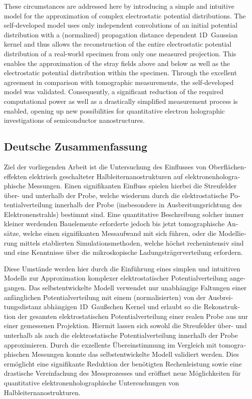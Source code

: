 These circumstances are addressed here by introducing a simple and intuitive model for the approximation of complex electrostatic potential distributions. The self-developed model uses only independent convolutions of an initial potential distribution with a (normalized) propagation distance dependent 1D~Gaussian kernel and thus allows the reconstruction of the entire electrostatic potential distribution of a real-world specimen from only one measured projection. This enables the approximation of the stray fields above and below as well as the electrostatic potential distribution within the specimen. Through the excellent agreement in comparison with tomographic measurements, the self-developed model was validated. Consequently, a significant reduction of the required computational power as well as a drastically simplified measurement process is enabled, opening up new possibilities for quantitative electron holographic investigations of semiconductor nanostructures.
\begin{otherlanguage}{ngerman}
\chapter*{Deutsche Zusammenfassung}
Ziel der vorliegenden Arbeit ist die Untersuchung des Einflusses von Oberflächeneffekten elektrisch geschalteter Halbleiternanostrukturen auf elektronenholographische Messungen. Einen signifikanten Einfluss spielen hierbei die Streufelder über- und unterhalb der Probe, welche wiederum durch die elektrostatische Potentialverteilung innerhalb der Probe (insbesondere in Ausbreitungsrichtung des Elektronenstrahls) bestimmt sind. Eine quantitative Beschreibung solcher immer kleiner werdenden Bauelemente erforderte jedoch bis jetzt tomographische Ansätze, welche einen signifikanten Messaufwand mit sich führen, oder die Modellierung mittels etablierten Simulationsmethoden, welche höchst rechenintensiv sind und eine Kenntnisse über die mikroskopische Ladungsträgerverteilung erfordern.

Diese Umstände werden hier durch die Einführung eines simplen und intuitiven Modells zur Approximation komplexer elektrostatischer Potentialverteilung angegangen. Das selbstentwickelte Modell verwendet nur unabhängige Faltungen einer anfänglichen Potentialverteilung mit einem (normalisierten) von der Ausbreitungsdistanz abhängigen 1D~Gaußschen Kernel und erlaubt so die Rekonstruktion der gesamten elektrostatischen Potentialverteilung einer realen Probe aus nur einer gemessenen Projektion. Hiermit lassen sich sowohl die Streufelder über- und unterhalb als auch die elektrostatische Potentialverteilung innerhalb der Probe approximieren. Durch die exzellente Übereinstimmung im Vergleich mit tomographischen Messungen konnte das selbstentwickelte Modell validiert werden. Dies ermöglicht eine signifikante Reduktion der benötigten Rechenleistung sowie eine drastische Vereinfachung des Messprozesses und eröffnet neue Möglichkeiten für quantitative elektronenholographische Untersuchungen von Halbleiternanostrukturen.
\end{otherlanguage}
